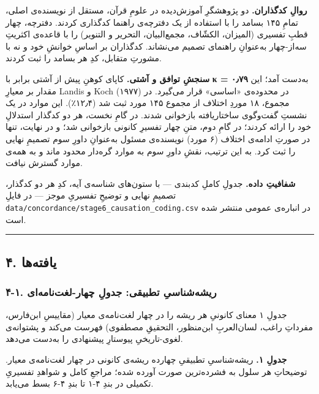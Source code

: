 \documentclass[12pt,a4paper]{article}
\begin{document}
\begin{RTL}
\begin{otherlanguage}{persian}
\textbf{روالِ کدگذاران.} دو پژوهشگرِ آموزش‌دیده در علومِ قرآن، مستقل از
نویسنده‌ی اصلی، تمامِ ۱۴۵ بسامد را با استفاده از یک دفترچه‌ی راهنما کدگذاری
کردند. دفترچه، چهار قطبِ تفسیری (المیزان، الکشّاف، مجمع‌البیان، التحریر و
التنویر) را با قاعده‌ی اکثریتِ سه‌از-چهار به‌عنوانِ راهنمای تصمیم می‌نشاند.
کدگذاران بر اساسِ خوانشِ خود و نه با مشورتِ متقابل، کدِ هر بسامد را ثبت
کردند.

\textbf{سنجشِ توافق و آشتی.} کاپای کوهنِ پیش از آشتی برابر با \textbf{κ =
۰٫۷۹} به‌دست آمد؛ این مقدار بر معیارِ Landis و Koch (۱۹۷۷) در محدوده‌ی
«اساسی» قرار می‌گیرد. در مجموع، ۱۸ موردِ اختلاف از مجموع ۱۴۵ مورد ثبت شد
(۱۲٫۴٪). این موارد در یک نشستِ گفت‌وگوی ساختاریافته بازخوانی شدند. در گامِ
نخست، هر دو کدگذار استدلالِ خود را ارائه کردند؛ در گامِ دوم، متنِ چهار
تفسیرِ کانونی بازخوانی شد؛ و در نهایت، تنها در صورتِ ادامه‌ی اختلاف (۶
مورد) نویسنده‌ی مسئول به‌عنوانِ داورِ سوم تصمیمِ نهایی را ثبت کرد. به این
ترتیب، نقشِ داورِ سوم به موارد گره‌دار محدود ماند و به همه‌ی موارد گسترش
نیافت.

\textbf{شفافیتِ داده.} جدولِ کاملِ کدبندی --- با ستون‌های شناسه‌ی آیه، کدِ هر
دو کدگذار، تصمیمِ نهایی و توضیحِ تفسیریِ موجز --- در فایلِ
\texttt{data/concordance/stage6\_causation\_coding.csv} در انباره‌ی عمومی
منتشر شده است.

\begin{center}\rule{0.5\linewidth}{0.5pt}\end{center}

\subsection{۴. یافته‌ها}\label{ux6ccux627ux641ux62aux647ux647ux627}

\subsubsection{۴-۱. ریشه‌شناسیِ تطبیقی: جدولِ
چهار-لغت‌نامه‌ای}\label{ux631ux6ccux634ux647ux634ux646ux627ux633ux6cc-ux62aux637ux628ux6ccux642ux6cc-ux62cux62fux648ux644-ux686ux647ux627ux631-ux644ux63aux62aux646ux627ux645ux647ux627ux6cc}

جدولِ ۱ معنای کانونیِ هر ریشه را در چهار لغت‌نامه‌ی معیار (مقاییسِ ابن‌فارس،
مفرداتِ راغب، لسان‌العربِ ابن‌منظور، التحقیقِ مصطفوی) فهرست می‌کند و پشتوانه‌ی
لغوی-تاریخیِ پیوستارِ پیشنهادی را به‌دست می‌دهد.

\textbf{جدولِ ۱.} ریشه‌شناسیِ تطبیقیِ چهارده ریشه‌ی کانونی در چهار لغت‌نامه‌ی
معیار. توضیحاتِ هر سلول به فشرده‌ترین صورت آورده شده؛ مراجعِ کامل و شواهدِ
تفسیریِ تکمیلی در بندِ ۴-۱ تا بندِ ۴-۶ بسط می‌یابد.


\end{otherlanguage}
\end{RTL}
\end{document}
